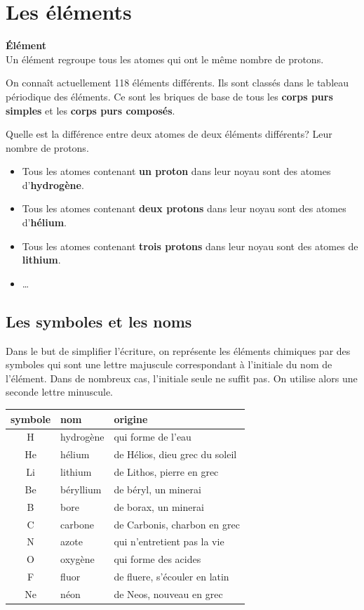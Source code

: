 \documentclass[
  11pt,
  french,
  a4paper,
  openany]{book}
\providecommand{\tightlist}{%
  \setlength{\itemsep}{0pt}\setlength{\parskip}{0pt}}
\begin{document}
\newpage

\hypertarget{les-uxe9luxe9ments}{%
\section{Les éléments}\label{les-uxe9luxe9ments}}

\begin{tcolorbox}
\textbf{Élément}\\
Un élément regroupe tous les atomes qui ont le même nombre de protons.

\end{tcolorbox}

On connaît actuellement 118 éléments différents. Ils sont classés dans le tableau périodique des éléments. Ce sont les briques de base de tous les \textbf{corps purs simples} et les \textbf{corps purs composés}.

Quelle est la différence entre deux atomes de deux éléments différents? Leur nombre de protons.

\begin{itemize}
\tightlist
\item
  Tous les atomes contenant \textbf{un proton} dans leur noyau sont des atomes d'\textbf{hydrogène}.
\item
  Tous les atomes contenant \textbf{deux protons} dans leur noyau sont des atomes d'\textbf{hélium}.
\item
  Tous les atomes contenant \textbf{trois protons} dans leur noyau sont des atomes de \textbf{lithium}.
\item
  \ldots{}
\end{itemize}

\hypertarget{les-symboles-et-les-noms}{%
\subsection{Les symboles et les noms}\label{les-symboles-et-les-noms}}

Dans le but de simplifier l'écriture, on représente les éléments chimiques par des symboles qui sont une lettre majuscule correspondant à l'initiale du nom de l'élément. Dans de nombreux cas, l'initiale seule ne suffit pas. On utilise alors une seconde lettre minuscule.

\begin{longtable}[]{@{}cll@{}}
\toprule
symbole & nom & origine\tabularnewline
\midrule
\endhead
H & hydrogène & qui forme de l'eau\tabularnewline
He & hélium & de Hélios, dieu grec du soleil\tabularnewline
Li & lithium & de Lithos, pierre en grec\tabularnewline
Be & béryllium & de béryl, un minerai\tabularnewline
B & bore & de borax, un minerai\tabularnewline
C & carbone & de Carbonis, charbon en grec\tabularnewline
N & azote & qui n'entretient pas la vie\tabularnewline
O & oxygène & qui forme des acides\tabularnewline
F & fluor & de fluere, s'écouler en latin\tabularnewline
Ne & néon & de Neos, nouveau en grec\tabularnewline
\bottomrule
\end{longtable}
\end{document}
